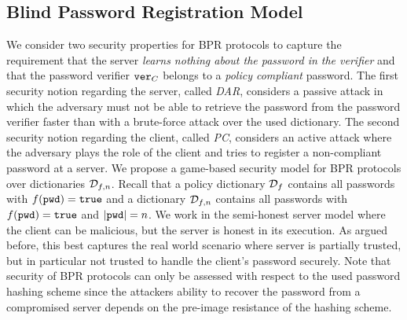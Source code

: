 \subsection{Blind Password Registration Model} \label{sec:bpr-model}
We consider two security properties for \ac{BPR} protocols to capture the requirement that the server \emph{learns nothing about the password in the verifier} and that the password verifier $\mathtt{ver}_C$ belongs to a \emph{policy compliant} password.
The first security notion regarding the server, called \emph{\ac{DAR}}, considers a passive attack in which the adversary must not be able to retrieve the password from the password verifier faster than with a brute-force attack over the used dictionary.
The second security notion regarding the client, called \emph{\ac{PC}}, considers an active attack where the adversary plays the role of the client and tries to register a non-compliant password at a server.
We propose a game-based security model for \ac{BPR} protocols over dictionaries $\mathcal{D}_{f,n}$.
Recall that a policy dictionary $\mathcal{D}_f$ contains all passwords \pwd with $f(\mathtt{pwd})=\mathtt{true}$ and a dictionary $\mathcal{D}_{f,n}$ contains all passwords \pwd with $f(\mathtt{pwd})=\mathtt{true}$ and $|\mathtt{pwd}|=n$.
We work in the semi-honest server model where the client can be malicious, but the server is honest in its execution.
As argued before, this best captures the real world scenario where server \Server is partially trusted, but in particular not trusted to handle the client's password securely.
Note that security of \ac{BPR} protocols can only be assessed with respect to the used password hashing scheme \HashP since the attackers ability to recover the password from a compromised server depends on the pre-image resistance of the hashing scheme.

